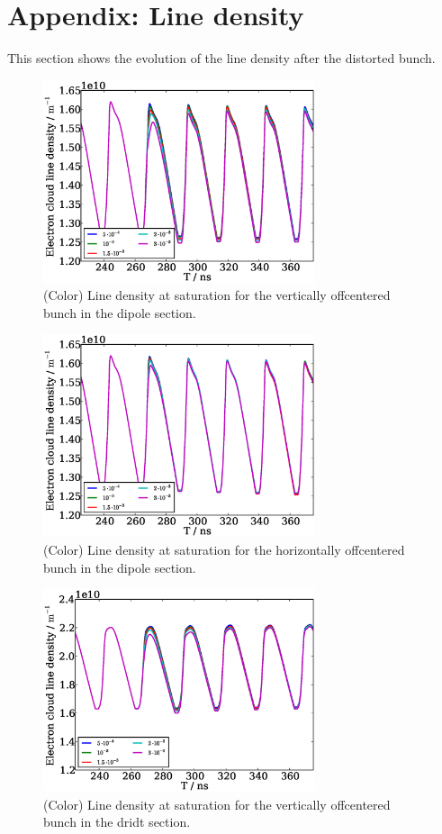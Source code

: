 \documentclass[5p]{elsarticle}%
\begin{document}
\section{Appendix: Line density}
This section shows the evolution of the line density after the distorted bunch.
\begin{figure}[htb]
\centering
\includegraphics*[width=80mm]{data/dipole_line_y.eps}
\caption{(Color) Line density at saturation for the vertically offcentered bunch in the dipole section.}
\label{line_dip_y}
\end{figure}

\begin{figure}[htb]
\centering
\includegraphics*[width=80mm]{data/dipole_line_x.eps}
\caption{(Color) Line density at saturation for the horizontally offcentered bunch in the dipole section.}
\label{line_dip_x}
\end{figure}

\begin{figure}[htb]
\centering
\includegraphics*[width=80mm]{data/drift_line_y.eps}
\caption{(Color) Line density at saturation for the vertically offcentered bunch in the dridt section.}
\label{line_dri_y}
\end{figure}
\begin{thebibliography}{16}%


\end{thebibliography}%
\end{document}
